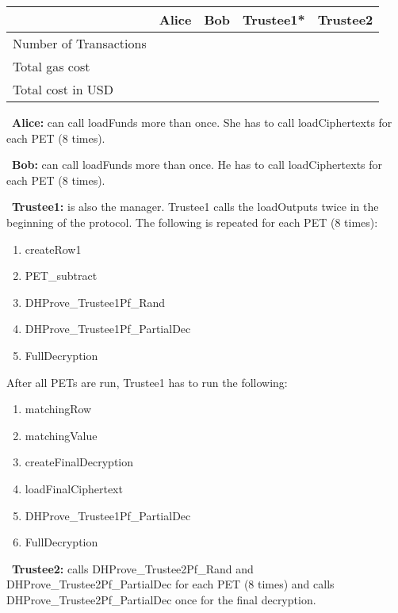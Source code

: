 \begin{table}[]
	\begin{tabular}{|l|l|l|l|l|}
		\hline
		& Alice &  Bob & Trustee1*  & Trustee2  \\ \hline
	Number of Transactions	&  &  &  &  \\ \hline
	Total gas cost	&  &  &  &  \\ \hline
	Total cost in USD	&  &  &  &  \\ \hline
	\end{tabular}
\end{table}

~\textbf{Alice:} can call loadFunds more than once. She has to call loadCiphertexts for each PET (8 times).

~\textbf{Bob:} can call loadFunds more than once. He has to call loadCiphertexts for each PET (8 times).

~\textbf{Trustee1:} is also the manager. Trustee1 calls the loadOutputs twice in the beginning of the protocol. The following is repeated for each PET (8 times): 
\begin{enumerate}
	\item createRow1
	\item PET\_subtract
	\item DHProve\_Trustee1Pf\_Rand
	\item DHProve\_Trustee1Pf\_PartialDec
	 \item FullDecryption
\end{enumerate}

After all PETs are run, Trustee1 has to run the following:
\begin{enumerate}
	\item matchingRow
	\item matchingValue
	\item createFinalDecryption
	\item loadFinalCiphertext
	\item DHProve\_Trustee1Pf\_PartialDec
	\item FullDecryption
\end{enumerate}

~\textbf{Trustee2:} calls DHProve\_Trustee2Pf\_Rand and DHProve\_Trustee2Pf\_PartialDec for each PET (8 times) and calls DHProve\_Trustee2Pf\_PartialDec once for the final decryption.
